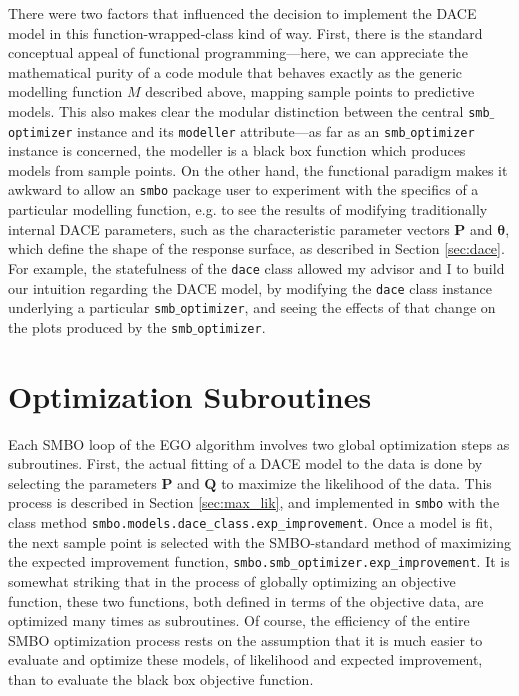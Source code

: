 There were two factors that influenced the decision to implement the DACE model in this function-wrapped-class kind of way. First, there is the standard conceptual appeal of functional programming---here, we can appreciate the mathematical purity of a code module that behaves exactly as the generic modelling function $M$ described above, mapping sample points to predictive models. This also makes clear the modular distinction between the central \texttt{smb$\_$optimizer} instance and its \texttt{modeller} attribute---as far as an \texttt{smb$\_$optimizer} instance is concerned, the modeller is a black box function which produces models from sample points. On the other hand, the functional paradigm makes it awkward to allow an \texttt{smbo} package user to experiment with the specifics of a particular modelling function, e.g. to see the results of modifying traditionally internal DACE parameters, such as the characteristic parameter vectors $\mathbf{P}$ and $\mathbf{\theta}$, which define the shape of the response surface, as described in Section \ref{sec:dace}. For example, the statefulness of the \texttt{dace} class allowed my advisor and I to build our intuition regarding the DACE model, by modifying the \texttt{dace} class instance underlying a particular \texttt{smb$\_$optimizer}, and seeing the effects of that change on the plots produced by the \texttt{smb$\_$optimizer}.






\section{Optimization Subroutines}\label{sec:sub_opt}
Each SMBO loop of the EGO algorithm involves two global optimization steps as subroutines. First, the actual fitting of a DACE model to the data is done by selecting the parameters $\mathbf{P}$ and $\mathbf{Q}$ to maximize the likelihood of the data. This process is described in Section \ref{sec:max_lik}, and implemented in \texttt{smbo} with the class method \texttt{smbo.models.dace\_class.exp\_improvement}. Once a model is fit, the next sample point is selected with the SMBO-standard method of maximizing the expected improvement function, \texttt{smbo.smb\_optimizer.exp\_improvement}. It is somewhat striking that in the process of globally optimizing an objective function, these two functions, both defined in terms of the objective data, are optimized many times as subroutines. Of course, the efficiency of the entire SMBO optimization process rests on the assumption that it is much easier to evaluate and optimize these models, of likelihood and expected improvement, than to evaluate the black box objective function. 

